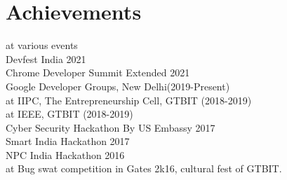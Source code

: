 \documentclass[]{deedy-resume-openfont}
\begin{document}
\begin{minipage}[t]{0.25\textwidth}

\section{Achievements}
\textbullet{}  at various events\\
\textbullet{}  Devfest India 2021\\
\textbullet{}  Chrome Developer Summit Extended 2021\\
\textbullet{}  Google Developer Groups, New Delhi(2019-Present)\\
\textbullet{}  at IIPC, The Entrepreneurship Cell, GTBIT (2018-2019)\\
\textbullet{}  at IEEE, GTBIT (2018-2019)\\
\textbullet{}  Cyber Security Hackathon By US Embassy 2017\\
\textbullet{}  Smart India Hackathon 2017\\
\textbullet{}  NPC India Hackathon 2016\\
\textbullet{}  at Bug swat competition in Gates 2k16, cultural fest of GTBIT.\\
\sectionsep
\end{minipage}
\hfill
\end{document}
